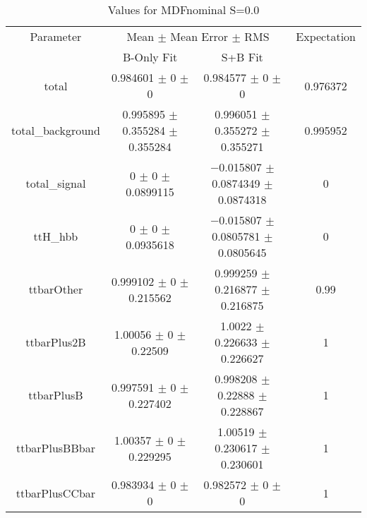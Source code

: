 \begin{table}
\centering
\caption{Values for MDFnominal S=0.0}
\begin{tabular}{cccc}
\toprule
Parameter & \multicolumn{2}{c}{Mean $\pm$ Mean Error $\pm$ RMS} & Expectation\\
 & B-Only Fit & S+B Fit & \\
\midrule
total & \num{0.984601} $\pm$ \num{0} $\pm$ \num{0} & \num{0.984577} $\pm$ \num{0} $\pm$ \num{0} & \num{0.976372}\\
total\_background & \num{0.995895} $\pm$ \num{0.355284} $\pm$ \num{0.355284} & \num{0.996051} $\pm$ \num{0.355272} $\pm$ \num{0.355271} & \num{0.995952}\\
total\_signal & \num{0} $\pm$ \num{0} $\pm$ \num{0.0899115} & \num{-0.015807} $\pm$ \num{0.0874349} $\pm$ \num{0.0874318} & \num{0}\\
ttH\_hbb & \num{0} $\pm$ \num{0} $\pm$ \num{0.0935618} & \num{-0.015807} $\pm$ \num{0.0805781} $\pm$ \num{0.0805645} & \num{0}\\
ttbarOther & \num{0.999102} $\pm$ \num{0} $\pm$ \num{0.215562} & \num{0.999259} $\pm$ \num{0.216877} $\pm$ \num{0.216875} & \num{0.99}\\
ttbarPlus2B & \num{1.00056} $\pm$ \num{0} $\pm$ \num{0.22509} & \num{1.0022} $\pm$ \num{0.226633} $\pm$ \num{0.226627} & \num{1}\\
ttbarPlusB & \num{0.997591} $\pm$ \num{0} $\pm$ \num{0.227402} & \num{0.998208} $\pm$ \num{0.22888} $\pm$ \num{0.228867} & \num{1}\\
ttbarPlusBBbar & \num{1.00357} $\pm$ \num{0} $\pm$ \num{0.229295} & \num{1.00519} $\pm$ \num{0.230617} $\pm$ \num{0.230601} & \num{1}\\
ttbarPlusCCbar & \num{0.983934} $\pm$ \num{0} $\pm$ \num{0} & \num{0.982572} $\pm$ \num{0} $\pm$ \num{0} & \num{1}\\
\bottomrule
\end{tabular}
\end{table}